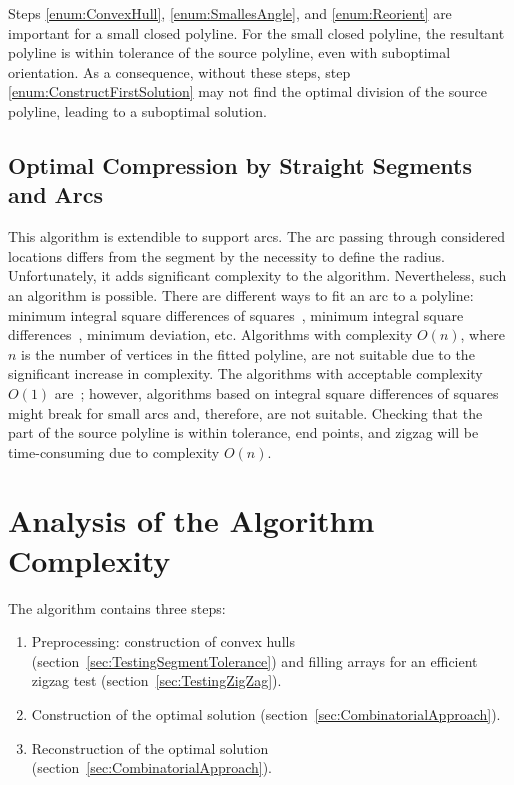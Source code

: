 \documentclass[conference]{IEEEtran}
\begin{document}
Steps \ref{enum:ConvexHull}, \ref{enum:SmallesAngle}, and \ref{enum:Reorient} are important for a small closed polyline. For the small closed polyline, the resultant polyline is within tolerance of the source polyline, even with suboptimal orientation. As a consequence, without these steps, step \ref{enum:ConstructFirstSolution} may not find the optimal division of the source polyline, leading to a suboptimal solution.

\subsection{Optimal Compression by Straight Segments and Arcs}

This algorithm is extendible to support arcs. The arc passing through considered locations differs from the segment by the necessity to define the radius. Unfortunately, it adds significant complexity to the algorithm. Nevertheless, such an algorithm is possible. There are different ways to fit an arc to a polyline: minimum integral square differences of squares~\cite{ThomasReference2, IchokuReference3}, minimum integral square differences~\cite{RobinsonReference6, Landau4, PaperArcFitting, FittingOfCircularArcsWithO1Complexity, EfficientFittingOfCircularArcs}, minimum deviation, etc. Algorithms with complexity $O{\left( n \right)}$, where $n$ is the number of vertices in the fitted polyline, are not suitable due to the significant increase in complexity. The algorithms with acceptable complexity $O{\left( 1 \right)}$ are~\cite{ThomasReference2, IchokuReference3, FittingOfCircularArcsWithO1Complexity, EfficientFittingOfCircularArcs}; however, algorithms based on integral square differences of squares~\cite{ThomasReference2, IchokuReference3} might break for small arcs and, therefore, are not suitable. Checking that the part of the source polyline is within tolerance, end points, and zigzag will be time-consuming due to complexity $O{\left( n \right)}$.

\section{Analysis of the Algorithm Complexity}

The algorithm contains three steps:
\begin{enumerate}[label={\arabic*.}]
  \item Preprocessing: construction of convex hulls (section~\ref{sec:TestingSegmentTolerance}) and filling arrays for an efficient zigzag test (section~\ref{sec:TestingZigZag}).
  \item Construction of the optimal solution (section~\ref{sec:CombinatorialApproach}).
  \item Reconstruction of the optimal solution (section~\ref{sec:CombinatorialApproach}).
\end{enumerate}
\end{document}

